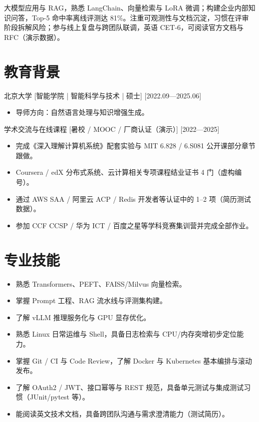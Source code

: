 \documentclass{resume-photo}
\begin{document}

\ResumeTitle

\noindent 大模型应用与 RAG，熟悉 LangChain、向量检索与 LoRA 微调；构建企业内部知识问答，Top-5 命中率离线评测达 81\%。注重可观测性与文档沉淀，习惯在评审阶段拆解风险；参与线上复盘与跨团队联调，英语 CET-6，可阅读官方文档与 RFC（演示数据）。

\section{教育背景}
\ResumeItem
{北京大学}
[\textnormal{智能学院 | 智能科学与技术 | 硕士}]
[2022.09—2025.06]

\begin{itemize}
  \item 导师方向：自然语言处理与知识增强生成。
\end{itemize}


\ResumeItem
{学术交流与在线课程}
[\textnormal{暑校 / MOOC / 厂商认证（演示）}]
[2022—2025]

\begin{itemize}
  \item 完成《深入理解计算机系统》配套实验与 MIT 6.828 / 6.S081 公开课部分章节跟做。
  \item Coursera / edX 分布式系统、云计算相关专项课程结业证书 4 门（虚构编号）。
  \item 通过 AWS SAA / 阿里云 ACP / Redis 开发者等认证中的 1--2 项（简历测试数据）。
  \item 参加 CCF CCSP / 华为 ICT / 百度之星等学科竞赛集训营并完成全部作业。
\end{itemize}



\section{专业技能}
\begin{itemize}
  \item 熟悉 Transformers、PEFT、FAISS/Milvus 向量检索。
  \item 掌握 Prompt 工程、RAG 流水线与评测集构建。
  \item 了解 vLLM 推理服务化与 GPU 显存优化。
  \item 熟悉 Linux 日常运维与 Shell，具备日志检索与 CPU/内存突增初步定位能力。
  \item 掌握 Git / CI 与 Code Review，了解 Docker 与 Kubernetes 基本编排与滚动发布。
  \item 了解 OAuth2 / JWT、接口幂等与 REST 规范，具备单元测试与集成测试习惯（JUnit/pytest 等）。
  \item 能阅读英文技术文档，具备跨团队沟通与需求澄清能力（测试简历）。
\end{itemize}
\end{document}
